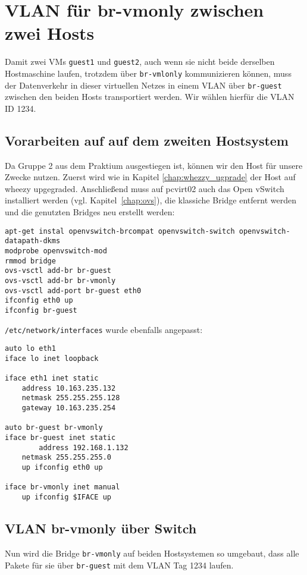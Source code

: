 \chapter{VLAN für br-vmonly zwischen zwei Hosts}
\label{vlan_trunk}
Damit zwei VMs \verb#guest1# und \verb#guest2#, auch wenn sie nicht beide derselben Hostmaschine laufen, trotzdem über \verb#br-vmlonly# kommunizieren können, muss der Datenverkehr in dieser virtuellen Netzes in einem VLAN über \verb#br-guest# zwischen den beiden Hosts transportiert werden. Wir wählen hierfür die VLAN ID 1234.

\section {Vorarbeiten auf auf dem zweiten Hostsystem}\label{ovs2}
Da Gruppe 2 aus dem Praktium ausgestiegen ist, können wir den Host für unsere Zwecke nutzen. Zuerst wird wie in Kapitel \ref{chap:whezzy_ugprade} der Host auf wheezy upgegraded.
Anschließend muss auf pcvirt02 auch das Open vSwitch installiert werden (vgl. Kapitel~\ref{chap:ovs}), die klassiche Bridge entfernt werden und die genutzten Bridges neu erstellt werden:
\begin{verbatim}
apt-get instal openvswitch-brcompat openvswitch-switch openvswitch-datapath-dkms
modprobe openvswitch-mod
rmmod bridge
ovs-vsctl add-br br-guest
ovs-vsctl add-br br-vmonly
ovs-vsctl add-port br-guest eth0
ifconfig eth0 up
ifconfig br-guest
\end{verbatim}

\verb#/etc/network/interfaces# wurde ebenfalls angepasst:
\setupVerbatimOut
\begin{verbatim}
auto lo eth1
iface lo inet loopback

iface eth1 inet static
    address 10.163.235.132
	netmask 255.255.255.128
	gateway 10.163.235.254

auto br-guest br-vmonly
iface br-guest inet static
        address 192.168.1.132
	netmask 255.255.255.0
	up ifconfig eth0 up

iface br-vmonly inet manual 
	up ifconfig $IFACE up 
\end{verbatim}

\section{VLAN br-vmonly über Switch}
Nun wird die Bridge \verb#br-vmonly# auf beiden Hostsystemen so umgebaut, dass alle Pakete für sie über \verb#br-guest# mit dem VLAN Tag 1234 laufen.

